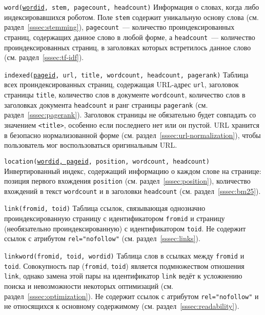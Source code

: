 \begin{definition}{\texttt{word(\underline{wordid}, stem, pagecount, headcount)}}
  Информация о словах, когда либо индексировавшихся роботом. Поле \verb|stem| содержит уникальную основу слова (см. раздел~\ref{sssec:stemming}), \verb|pagecount|~--- количество проиндексированных страниц, содержащих данное слово в любой форме, а \verb|headcount|~--- количество проиндексированных страниц, в заголовках которых встретилось данное слово (см. раздел~\ref{sssec:tf-idf}).
\end{definition}

\begin{definition}{\texttt{indexed(\underline{pageid}, url, title, wordcount, headcount, pagerank)}}
  Таблица всех проиндексированных страниц, содержащая URL-адрес \verb|url|, заголовок страницы \verb|title|, количество слов в документе \verb|wordcount|, количество слов в заголовках документа \verb|headcount| и ранг страницы \verb|pagerank| (см. раздел~\ref{sssec:pagerank}). Заголовок страницы не обязательно будет совпадать со значением \verb|<title>|, особенно если последнего нет или он пустой. URL хранится в безопасно нормализованной форме (см. раздел~\ref{sssec:url-normalization}), чтобы пользователь мог воспользоваться оригинальным URL.
\end{definition}

\begin{definition}{\texttt{location(\underline{wordid, pageid}, position, wordcount, headcount)}}
  Инвертированный индекс, содержащий информацию о каждом слове на странице: позиция первого вхождения \verb|position| (см. раздел~\ref{sssec:position}), количество вхождений в текст \verb|wordcount| и в заголовки \verb|headcount| (см. раздел~\ref{sssec:bm25}).
\end{definition}

\begin{definition}{\texttt{link(fromid, toid)}}
  Таблица ссылок, связывающая однозначно проиндексированную страницу с идентификатором \verb|fromid| и страницу (необязательно проиндексированную) с идентификатором \verb|toid|. Не содержит ссылок с атрибутом \verb|rel="nofollow"| (см. раздел~\ref{sssec:links}).
\end{definition}

\begin{definition}{\texttt{linkword(fromid, toid, wordid)}}
  Таблица слов в ссылках между \verb|fromid| и \verb|toid|. Совокупность пар (\verb|fromid|, \verb|toid|) является подмножеством отношения \verb|link|, однако замена этой пары на идентификатор \verb|link| ведёт к усложнению поиска и невозможности некоторых оптимизаций (см. раздел~\ref{sssec:optimization}). Не содержит ссылок с атрибутом \verb|rel="nofollow"| и не относящихся к основному содержимому (см. раздел~\ref{sssec:readability}).
\end{definition}


